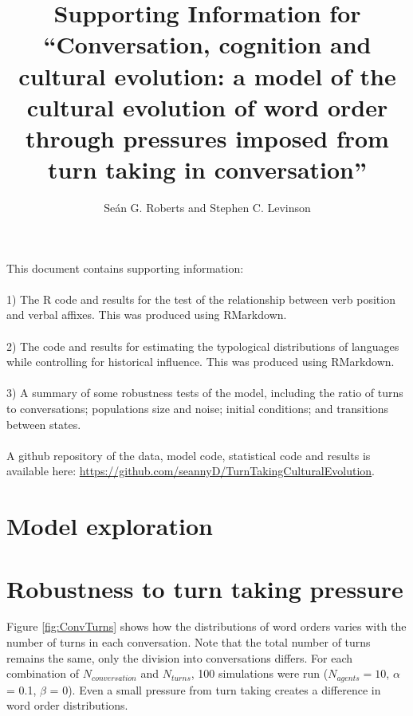 \documentclass[12pt]{article}
\title{Supporting Information for ``Conversation, cognition and cultural evolution: a model of the cultural evolution of word order through pressures imposed from turn taking in conversation''}
\author{Se\'{a}n G. Roberts and Stephen C. Levinson}
\date{} %
\begin{document}
\maketitle

This document contains supporting information:
\\\\
1) The R code and results for the test of the relationship between verb position and verbal affixes.  This was produced using RMarkdown.
\\\\
2) The code and results for estimating the typological distributions of languages while controlling for historical influence.  This was produced using RMarkdown.
\\\\
3) A summary of some robustness tests of the model, including the ratio of turns to conversations; populations size and noise; initial conditions; and transitions between states.
\\\\
A github repository of the data, model code, statistical code and results is available here: \url{https://github.com/seannyD/TurnTakingCulturalEvolution}.





\clearpage
\newpage

\section*{Model exploration}

\section{Robustness to turn taking pressure}
Figure \ref{fig:ConvTurns} shows how the distributions of word orders varies with the number of turns in each conversation.  Note that the total number of turns remains the same, only the division into conversations differs.  For each combination of $N_{conversation}$ and $N_{turns}$, 100 simulations were run ($N_{agents} = 10$, $\alpha$ = 0.1, $\beta$ = 0).  %
Even a small pressure from turn taking creates a difference in word order distributions.
\end{document}
